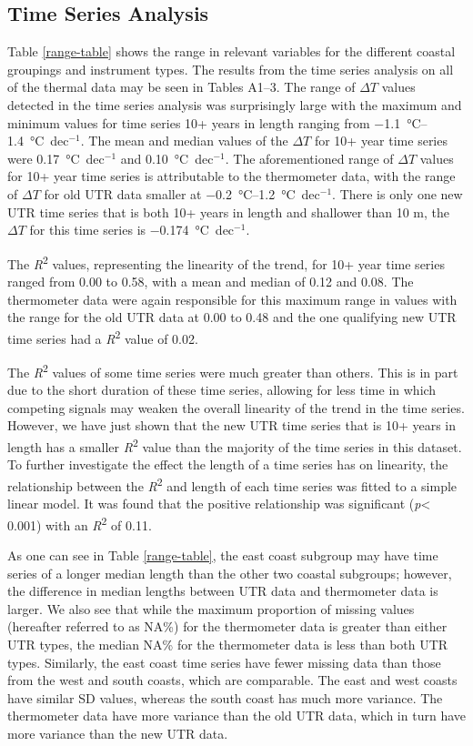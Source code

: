 \documentclass{ametsoc}
\begin{document}
\subsection{Time Series Analysis}
Table \ref{range-table} shows the range in relevant variables for the different coastal groupings and instrument types. The results from the time series analysis on all of the thermal data may be seen in Tables A1--3. The range of $\Delta T$ values detected in the time series analysis was surprisingly large with the maximum and minimum values for time series 10+ years in length ranging from \SIrange{-1.1}{1.4}{\degreeCelsius}~dec$^{-1}$. The mean and median values of the $\Delta T$ for 10+ year time series were \SI{0.17}{\degreeCelsius}~dec$^{-1}$ and \SI{0.10}{\degreeCelsius}~dec$^{-1}$. The aforementioned range of $\Delta T$ values for 10+ year time series is attributable to the thermometer data, with the range of $\Delta T$ for old UTR data smaller at \SIrange{-0.2}{1.2}{\degreeCelsius}~dec$^{-1}$. There is only one new UTR time series that is both 10+ years in length and shallower than 10 m, the $\Delta T$ for this time series is \SI{-0.174}{\degreeCelsius}~dec$^{-1}$.

The \emph{R}\textsuperscript{2} values, representing the linearity of the trend, for 10+ year time series ranged from 0.00 to 0.58, with a mean and median of 0.12 and 0.08. The thermometer data were again responsible for this maximum range in values with the range for the old UTR data at 0.00 to 0.48 and the one qualifying new UTR time series had a \emph{R}\textsuperscript{2} value of 0.02.

The \emph{R}\textsuperscript{2} values of some time series were much greater than others. This is in part due to the short duration of these time series, allowing for less time in which competing signals may weaken the overall linearity of the trend in the time series. However, we have just shown that the new UTR time series that is 10+ years in length has a smaller \emph{R}\textsuperscript{2} value than the majority of the time series in this dataset. To further investigate the effect the length of a time series has on linearity, the relationship between the \emph{R}\textsuperscript{2} and length of each time series was fitted to a simple linear model. It was found that the positive relationship was significant (\emph{p}\num{< 0.001}) with an \emph{R}\textsuperscript{2} of 0.11.

As one can see in Table \ref{range-table}, the east coast subgroup may have time series of a longer median length than the other two coastal subgroups; however, the difference in median lengths between UTR data and thermometer data is larger. We also see that while the maximum proportion of missing values (hereafter referred to as NA\%) for the thermometer data is greater than either UTR types, the median NA\% for the thermometer data is less than both UTR types. Similarly, the east coast time series have fewer missing data than those from the west and south coasts, which are comparable. The east and west coasts have similar SD values, whereas the south coast has much more variance. The thermometer data have more variance than the old UTR data, which in turn have more variance than the new UTR data.
\end{document}
